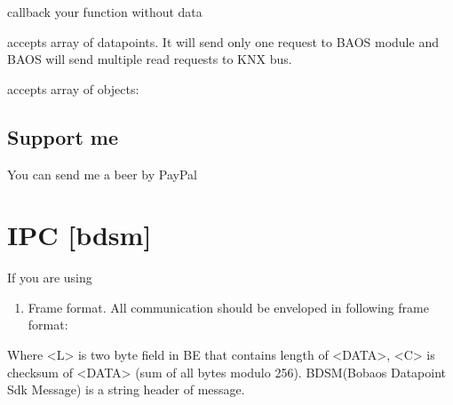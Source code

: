 \documentclass[letterpaper,10pt,english]{sphinxmanual}
\begin{document}
 callback your function without data

 accepts array of datapoints. It will send only one request to BAOS module and BAOS will send multiple read requests to KNX bus.

 accepts array of objects: 


\section{Support me}
\label{\detokenize{bdsd.client:support-me}}\label{\detokenize{bdsd.client:support-me}}
You can send me a beer by PayPal



\chapter{IPC {[}bdsm{]}}
\label{\detokenize{bdsm:ipc-bdsm}}\label{\detokenize{bdsm:ipc-bdsm}}\label{\detokenize{bdsm::doc}}
If you are using
\begin{enumerate}
\item {} 
Frame format.
All communication should be enveloped in following frame format:

\end{enumerate}

%
\begin{sphinxVerbatim}[commandchars=\\\{\}]
\end{sphinxVerbatim}

Where \textless{}L\textgreater{} is two byte field in BE that contains length of \textless{}DATA\textgreater{}, \textless{}C\textgreater{} is checksum of \textless{}DATA\textgreater{} (sum of all bytes modulo 256). BDSM(Bobaos Datapoint Sdk Message) is a string header of message.
\end{document}
